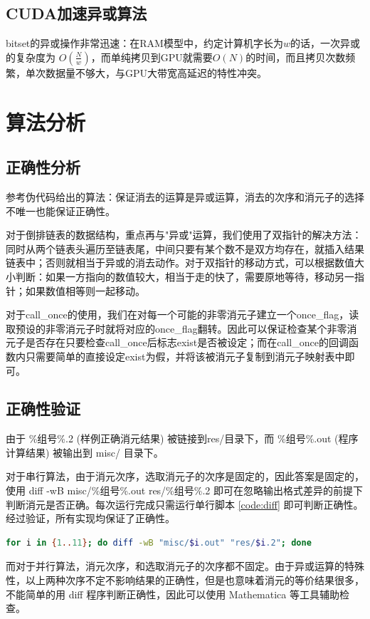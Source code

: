 \documentclass[a4paper]{article}
\begin{document}
\subsection{CUDA加速异或算法}
bitset的异或操作非常迅速：在RAM模型中，约定计算机字长为$w$的话，一次异或的复杂度为 $O(\frac{N}{w})$，而单纯拷贝到GPU就需要$O(N)$的时间，而且拷贝次数频繁，单次数据量不够大，与GPU大带宽高延迟的特性冲突。

\section{算法分析}
\subsection{正确性分析}
参考伪代码给出的算法：保证消去的运算是异或运算，消去的次序和消元子的选择不唯一也能保证正确性。

对于倒排链表的数据结构，重点再与"异或"运算，我们使用了双指针的解决方法：同时从两个链表头遍历至链表尾，中间只要有某个数不是双方均存在，就插入结果链表中；否则就相当于异或的消去动作。对于双指针的移动方式，可以根据数值大小判断：如果一方指向的数值较大，相当于走的快了，需要原地等待，移动另一指针；如果数值相等则一起移动。

对于call\_once的使用，我们在对每一个可能的非零消元子建立一个once\_flag，读取预设的非零消元子时就将对应的once\_flag翻转。因此可以保证检查某个非零消元子是否存在只要检查call\_once后标志exist是否被设定；而在call\_once的回调函数内只需要简单的直接设定exist为假，并将该被消元子复制到消元子映射表中即可。

\subsection{正确性验证}
由于 \%组号\%.2 (样例正确消元结果) 被链接到res/目录下，而 \%组号\%.out (程序计算结果) 被输出到 misc/ 目录下。

对于串行算法，由于消元次序，选取消元子的次序是固定的，因此答案是固定的，使用 diff -wB misc/\%组号\%.out res/\%组号\%.2 即可在忽略输出格式差异的前提下判断消元是否正确。每次运行完成只需运行单行脚本 \ref{code:diff} 即可判断正确性。经过验证，所有实现均保证了正确性。
\begin{lstlisting}[frame=trbl, language={bash}, caption={单行 Bash 脚本}, label = {code:diff}]
  for i in {1..11}; do diff -wB "misc/$i.out" "res/$i.2"; done
\end{lstlisting}

而对于并行算法，消元次序，和选取消元子的次序都不固定。由于异或运算的特殊性，以上两种次序不定不影响结果的正确性，但是也意味着消元的等价结果很多，不能简单的用 diff 程序判断正确性，因此可以使用 Mathematica 等工具辅助检查。
\end{document}
